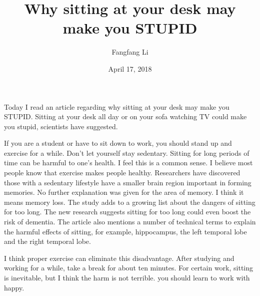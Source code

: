 \documentclass{article}
\author{Fangfang Li}
\date{April 17, 2018}
\title{Why sitting at your desk may make you STUPID}
\begin{document}
\maketitle
Today I read an article regarding why sitting at your desk may make you STUPID. Sitting at your desk all day or on your sofa watching TV could make you stupid, scientists have suggested.

If you are a student or have to sit down to work, you should stand up and exercise for a while. Don't let yourself stay sedentary. Sitting for long periods of time can be harmful to one's health. I feel this is a common sense. I believe most people know that exercise makes people healthy. Researchers have discovered those with a sedentary lifestyle have a smaller brain region important in forming memories. No further explanation was given for the area of memory. I think it means memory loss. The study adds to a growing list about the dangers of sitting for too long.                The new research suggests sitting for too long could even boost the risk of dementia. The article also mentions a number of technical terms to explain the harmful effects of sitting, for example, hippocampus, the left temporal lobe and the right temporal lobe.

I think proper exercise can eliminate this disadvantage. After studying and working for a while, take a break for about ten minutes. For certain work, sitting is inevitable, but I think the harm is not terrible. you should learn to work with happy.
\end{document}
